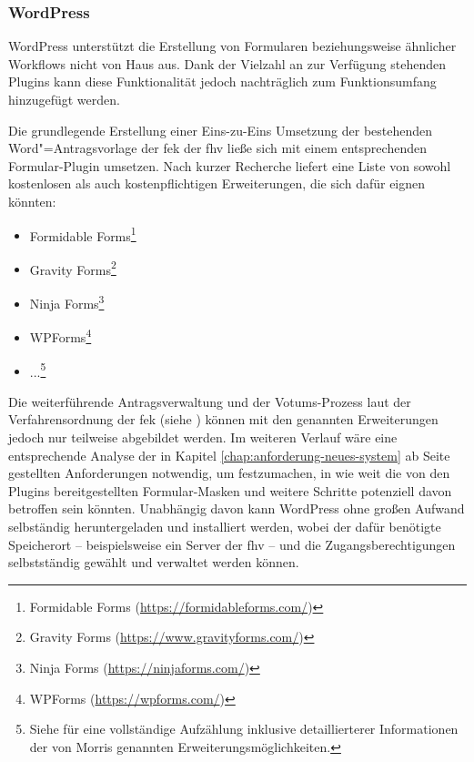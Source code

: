 \documentclass[a4paper,12pt,twoside]{scrreprt}
\begin{document}
\subsubsection*{WordPress}
\label{sub-sub-sec:wordpress}

WordPress unterstützt die Erstellung von Formularen beziehungsweise ähnlicher Workflows nicht von Haus aus. Dank der Vielzahl an zur Verfügung stehenden Plugins kann diese Funktionalität jedoch nachträglich zum Funktionsumfang hinzugefügt werden.

Die grundlegende Erstellung einer Eins-zu-Eins Umsetzung der bestehenden Word"=Antragsvorlage der \ac{fek} der \ac{fhv} ließe sich mit einem entsprechenden Formular-Plugin umsetzen. Nach kurzer Recherche liefert \cite{morris_8_2023} eine Liste von sowohl kostenlosen als auch kostenpflichtigen Erweiterungen, die sich dafür eignen könnten:
\begin{itemize}
    \item Formidable Forms\footnote{Formidable Forms (\url{https://formidableforms.com/})}
    \item Gravity Forms\footnote{Gravity Forms (\url{https://www.gravityforms.com/})}
    \item Ninja Forms\footnote{Ninja Forms (\url{https://ninjaforms.com/})}
    \item WPForms\footnote{WPForms (\url{https://wpforms.com/})}
    \item ...\footnote{Siehe \cite{morris_8_2023} für eine vollständige Aufzählung inklusive detaillierterer Informationen der von Morris genannten Erweiterungsmöglichkeiten.}
\end{itemize}

Die weiterführende Antragsverwaltung und der Votums-Prozess laut der Verfahrensordnung der \ac{fek} (siehe \cite{forschungsethik-kommission_der_fachhochschule_vorarlberg_verfahrensordnung_2020}) können mit den genannten Erweiterungen jedoch nur teilweise abgebildet werden. Im weiteren Verlauf wäre eine entsprechende Analyse der in Kapitel \ref{chap:anforderung-neues-system} ab Seite \pageref{chap:anforderung-neues-system} gestellten Anforderungen notwendig, um festzumachen, in wie weit die von den Plugins bereitgestellten Formular-Masken und weitere Schritte potenziell davon betroffen sein könnten. Unabhängig davon kann WordPress ohne großen Aufwand selbständig heruntergeladen und installiert werden, wobei der dafür benötigte Speicherort -- beispielsweise ein Server der \acl{fhv} -- und die Zugangsberechtigungen selbstständig gewählt und verwaltet werden können.
\end{document}
